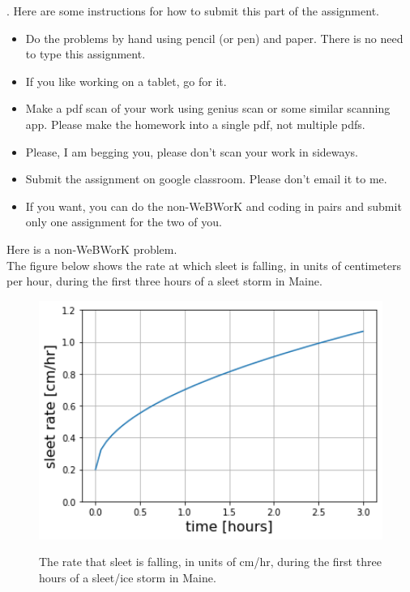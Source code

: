 \documentclass[12pt]{article}
\begin{document}
.  Here are some
instructions for how to submit this part of the assignment.
\begin{itemize}
  \setlength{\itemsep}{-1mm}
\item Do the problems by hand using pencil (or pen) and paper.
  There is no need to type this assignment.
\item If you like working on a tablet, go for it. 
\item Make a pdf scan of your work using genius scan or some
  similar scanning app.  Please make the homework into a single
  pdf, not multiple pdfs.
  \item Please, I am begging you, please don't scan your work in
    sideways. \smiley{}
\item Submit the assignment on google classroom.  Please don't
  email it to me.  %
\item If you want, you can do the non-WeBWorK and coding in pairs and
  submit only one assignment for the two of you. \\
\end{itemize}

\noindent Here is a non-WeBWorK problem.\\

\noindent The figure below shows the rate at which sleet is falling,
in units of centimeters per hour, during the first three hours of a
sleet storm in Maine. 


\begin{figure}[h]
\begin{center}
\vspace{1mm}
\includegraphics[width=5.0in]{sleet.png}
\vspace{-1mm}
\caption{The rate that sleet is falling, in units of cm/hr, during the
  first three hours of a sleet/ice storm in Maine.}
\vspace{-5mm}
\label{fig:graph1}
\end{center}
\end{figure}
\end{document}
